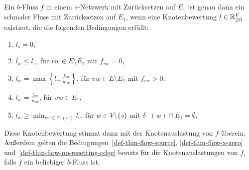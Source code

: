 \begin{lemma}\label{lemma-thin-flow-t-def}
	Ein $b$-Fluss $f$ in einem $s$-Netzwerk mit Zurücksetzen auf $E_1$ ist genau dann ein schmaler Fluss mit Zurücksetzen auf $E_1$, wenn eine Knotenbewertung $l\in\mathbb{R}_{\geq 0}^V$ existiert, die die folgenden Bedingungen erfüllt:
	\begin{enumerate}[label=(T\arabic*)]
		\item\label{def-thin-flow-source} $\displaystyle l_s = 0$,
		\item\label{def-thin-flow-x-zero} $\displaystyle l_w \leq l_v$, \tabto{4.5cm} für $vw\in E \setminus E_1$ mit $f_{vw}=0$,
		\item\label{def-thin-flow-x-positive} $\displaystyle l_w = \max\left\{ l_v, \frac{f_{vw}}{u_{vw}} \right\}$,  \tabto{4.5cm} für $vw\in E\setminus E_1$ mit $f_{vw} > 0$,
		\item\label{def-thin-flow-resetting-edge} $\displaystyle l_w = \frac{f_{vw}}{u_{vw}}$,  \tabto{4.5cm} für $vw\in E_1$,
		\item\label{def-thin-flow-no-resetting-edge} $\displaystyle l_w \geq \min_{vw\in \delta^-(w)} l_v$, \tabto{4.5cm} für $w\in V\setminus \{ s \}$ mit $\delta^-(w)\cap E_1 = \emptyset$.
	\end{enumerate}
	Diese Knotenbewertung stimmt dann mit der Knotenauslastung von $f$ überein.
	Außerdem gelten die Bedingungen~\ref{def-thin-flow-source}, \ref{def-thin-flow-x-zero} und~\ref{def-thin-flow-no-resetting-edge} bereits für die Knotenauslastungen von $f$, falls $f$ ein beliebiger $b$-Fluss ist.
\end{lemma}
